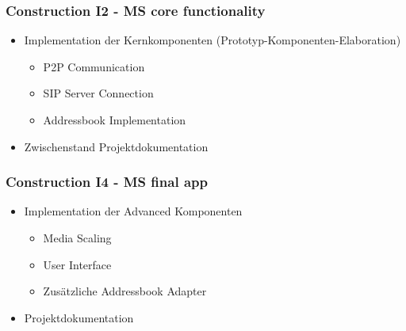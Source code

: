 		\subsubsection{Construction I2 - MS core functionality}
			\begin{itemize}
				\item Implementation der Kernkomponenten (Prototyp-Komponenten-Elaboration)
					\begin{itemize}
						\item P2P Communication
						\item SIP Server Connection
						\item Addressbook Implementation
					\end{itemize}
				\item Zwischenstand Projektdokumentation
			\end{itemize}
			
		\subsubsection{Construction I4 - MS final app}
			\begin{itemize}
				\item Implementation der Advanced Komponenten
					\begin{itemize}
						\item Media Scaling
						\item User Interface
						\item Zusätzliche Addressbook Adapter
					\end{itemize}
				\item Projektdokumentation
			\end{itemize}
	

